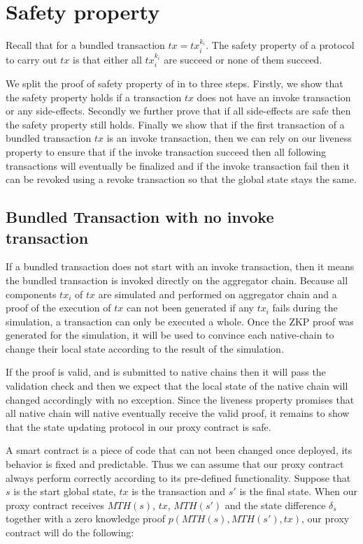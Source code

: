 \documentclass[pageno]{jpaper}
\begin{document}
\section{Safety property}
Recall that for a bundled transaction $tx = {tx_i^{k_i}}$. The safety property of a protocol to carry out $tx$ is that either all $tx_i^{k_i}$ are succeed or none of them succeed.

We split the proof of safety property of \dprotocol in to three steps. Firstly, we show that the safety property holds if a transaction $tx$ does not have an invoke transaction or any side-effects. Secondly we further prove that if all side-effects are safe then the safety property still holds. Finally we show that if the first transaction of a bundled transaction $tx$ is an invoke transaction, then we can rely on our liveness property to ensure that if the invoke transaction succeed then all following transactions will eventually be finalized and if the invoke transaction fail then it can be revoked using a revoke transaction so that the global state stays the same. 

\subsection{Bundled Transaction with no invoke transaction}
If a bundled transaction does not start with an invoke transaction, then it means the bundled transaction is invoked directly on the aggregator chain. Because all components $tx_i$ of $tx$ are simulated and performed on aggregator chain and a proof of the execution of $tx$ can not been generated if any $tx_i$ fails during the simulation, a transaction can only be executed a whole. Once the ZKP proof was generated for the simulation, it will be used to convince each native-chain to change their local state according to the result of the simulation.

If the proof is valid, and is submitted to native chains then it will pass the validation check and  then we expect that the local state of the native chain will changed accordingly with no exception. Since the liveness property promises that all native chain will native eventually receive the valid proof, it remains to show that the state updating protocol in our proxy contract is safe.

A smart contract is a piece of code that can not been changed once deployed, its behavior is fixed and predictable. Thus we can assume that our proxy contract always perform correctly according to its pre-defined functionality. Suppose that $s$ is the start global state, $tx$ is the transaction and $s'$ is the final state. When our proxy contract receives $MTH(s)$, $tx$, $MTH(s')$ and the state difference $\delta_{s}$ together with a zero knowledge proof $p(MTH(s), MTH(s'), tx)$, our proxy contract will do the following:
\end{document}
